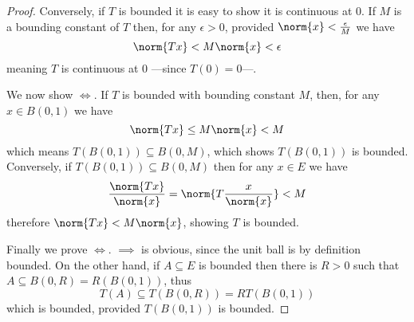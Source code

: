 \documentclass[12pt,oneside]{book}
\begin{document}
{\begin{proof}
	Conversely, if \( T \) is bounded it is easy to show it is continuous at 0. If \( M \) is
	a bounding constant of \( T \) then, for any \( \epsilon > 0 \), provided \( \norm{x} <
	\frac{\epsilon}{M} \) we have
	\begin{equation*}
		\norm{Tx} < M\norm{x} < \epsilon
	\end{equation*}
	meaning \( T \) is continuous at 0 ---since \( T(0) = 0 \)---.

	We now show \( \iff \). If \( T \) is bounded with bounding
	constant \( M \), then, for any \( x \in B(0,1) \) we have
	\begin{equation*}
		\norm{Tx} \leq M \norm{x} < M
	\end{equation*}
	which means \( T(B(0,1)) \subseteq B(0,M) \), which shows \( T(B(0,1)) \) is bounded.
	Conversely, if \( T(B(0,1)) \subseteq B(0,M) \) then for any \( x \in E \) we have
	\begin{equation*}
		\frac{\norm{Tx}}{\norm{x}} = \norm{T\frac{x}{\norm{x}}} < M
	\end{equation*}
	therefore \( \norm{Tx} < M\norm{x} \), showing \( T \) is bounded.

	Finally we prove \( \iff \). \( \implies
	\) is obvious, since the unit ball is by definition bounded. On the other
	hand, if \( A \subseteq E \) is bounded then there is \( R > 0 \) such that \( A
	\subseteq B(0,R) = R(B(0,1)) \), thus
	\begin{equation*}
		T(A) \subseteq T(B(0,R)) = RT(B(0,1))
	\end{equation*}
	which is bounded, provided \( T(B(0,1)) \) is bounded.
\end{proof}
}
\end{document}

